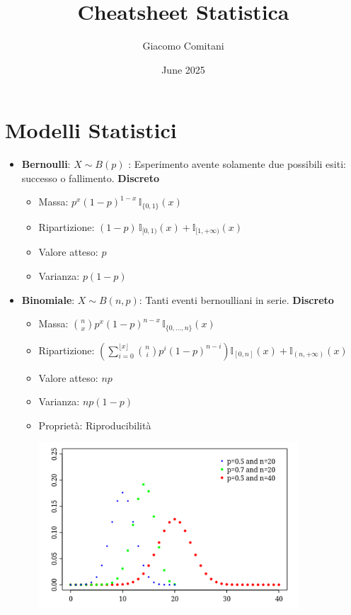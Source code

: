 \documentclass{article}
\title{Cheatsheet Statistica}
\author{Giacomo Comitani}
\date{June 2025}
\begin{document}
\maketitle

\section{Modelli Statistici}

\begin{itemize}
    \item \textbf{Bernoulli}: $X \sim B(p)$ : Esperimento avente solamente due possibili esiti: successo o fallimento. \textbf{Discreto}
    \begin{itemize}
        \item Massa: $p^x (1-p)^{1-x} \, \mathbb{I}_{\{0, 1\}}(x)$
        \item Ripartizione: $(1-p) \, \mathbb{I}_{[0,1)}(x) + \mathbb{I}_{[1, +\infty)}(x)$
        \item Valore atteso: $p$
        \item Varianza: $p(1-p)$ 
    \end{itemize}

    \item \textbf{Binomiale}: $X \sim B(n, p)$: Tanti eventi bernoulliani in serie. \textbf{Discreto}
    \begin{itemize}
        \item Massa: $\binom{n}{x} p^x (1-p)^{n-x} \, \mathbb{I}_{\{0, ..., n\}}(x)$
        \item Ripartizione: $\left( \sum_{i=0}^{\lfloor x \rfloor} \binom{n}{i} p^i (1 - p)^{n-i} \right) \mathbb{I}_{[0, n]}(x) + \mathbb{I}_{(n, +\infty)}(x)$
        \item Valore atteso: $n p$
        \item Varianza: $n p(1-p)$
        \item Proprietà: Riproducibilità
        \begin{center}
            \includegraphics[width=0.4\linewidth]{./immagini/binomiale.png}
        \end{center}
    \end{itemize}


\end{itemize}
\end{document}
